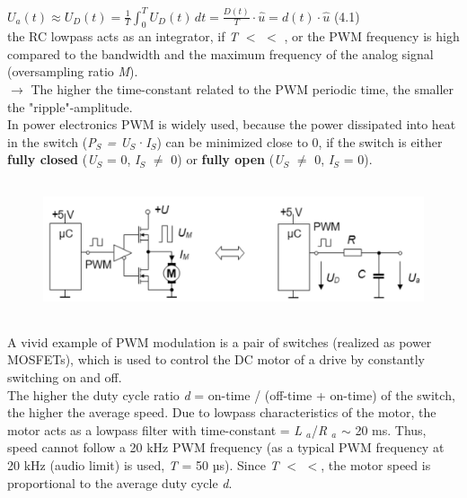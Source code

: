  $U_{a} (t)\approx U_{D} (t)=\frac{1}{T} \int _{0}^{T}U_{D} (t)\, dt =\frac{D(t)}{T} \cdot \hat{u}=d(t)\cdot \hat{u}$  (4.1) \\

the RC lowpass acts as an integrator, if \textit{T} $\mathrm{<}$ $\mathrm{<}$ , or the PWM frequency is high compared to the bandwidth and the maximum frequency of the analog signal (oversampling ratio \textit{M}). \\

$\rightarrow$ The higher the time-constant related to the PWM periodic time, the smaller the "ripple"-amplitude.\\

In power electronics PWM is widely used, because the power dissipated into heat in the switch (\textit{P${}_{S}$ = U${}_{S}$}·\textit{I${}_{S}$}) can be minimized close to 0, if the switch is either \textbf{fully closed} (\textit{U${}_{S}$} = 0, \textit{I${}_{S}$} $\mathrm{\neq}$ 0) or \textbf{fully open} (\textit{U${}_{S}$} $\mathrm{\neq}$ 0, \textit{I${}_{S}$}  = 0).

    \begin{figure}[h]
    \centering
    \includegraphics[width=14cm, height=4cm]{Images/image171.png}
    \label{fig:Fig 125}
    \end{figure}

A vivid example of PWM modulation is a pair of switches (realized as power MOSFETs), which is used to control the DC motor of a drive by constantly switching on and off.\\

The higher the duty cycle ratio \textit{d} = on-time / (off-time + on-time) of the switch, the higher the average speed. Due to lowpass characteristics of the motor, the motor acts as a lowpass filter with time-constant  = \textit{L ${}_{a}$}/\textit{R ${}_{a}$} $\mathrm{\sim}$ 20 ms. Thus, speed cannot follow a 20 kHz PWM frequency (as a typical PWM frequency at 20 kHz (audio limit) is used,  \textit{T} = 50 µs). Since \textit{T} $\mathrm{<}$ $\mathrm{<}$, the motor speed is proportional to the average duty cycle \textit{d}. \\

